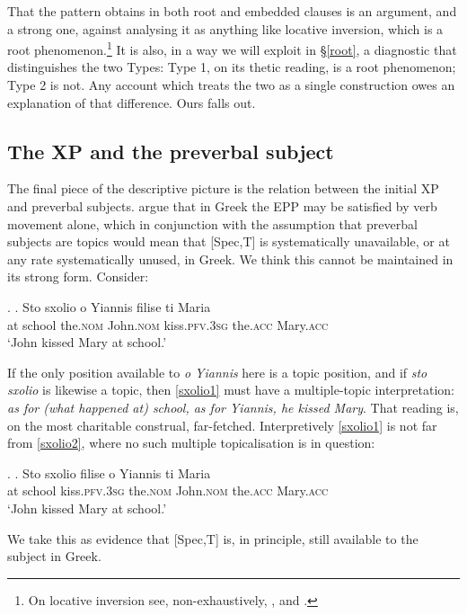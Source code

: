 \documentclass[11pt]{article}
\newcommand{\typa}{{Type 1}\xspace}
\newcommand{\typb}{{Type 2}\xspace}
\newcommand{\pfv}{\textsc{pfv}\xspace}
\begin{document}
That the pattern obtains in both root and embedded clauses is an argument, and a strong one, against analysing it as anything like locative inversion, which is a root phenomenon.\footnote{On locative inversion see, non-exhaustively, \citet{bresnan:94}, \citet{bresnan-kanerva:89} and \citet{levin-rappaport:95}.}  It is also, in a way we will exploit in \S\ref{root}, a diagnostic that distinguishes the two Types: \typa, on its thetic reading, is a root phenomenon; \typb is not.  Any account which treats the two as a single construction owes an explanation of that difference.  Ours falls out.

\subsection{The XP and the preverbal subject}\label{compdist}

The final piece of the descriptive picture is the relation between the initial XP and preverbal subjects.  \citet{alexiadou-anagnostopoulou:98} argue that in Greek the EPP may be satisfied by verb movement alone, which in conjunction with the assumption that preverbal subjects are topics \citep{philippaki:85, tsimpli:90} would mean that [Spec,T] is systematically unavailable, or at any rate systematically unused, in Greek.  We think this cannot be maintained in its strong form.  Consider:

\ex. \label{sxolio1}
\exg. Sto sxolio o Yiannis filise ti Maria\\
at school the.\textsc{nom} John.\textsc{nom} kiss.\pfv.3\textsc{sg} the.\textsc{acc} Mary.\textsc{acc}\\
`John kissed Mary at school.'

If the only position available to \emph{o Yiannis} here is a topic position, and if \emph{sto sxolio} is likewise a topic, then \ref{sxolio1} must have a multiple-topic interpretation: \emph{as for (what happened at) school, as for Yiannis, he kissed Mary}.  That reading is, on the most charitable construal, far-fetched.  Interpretively \ref{sxolio1} is not far from \ref{sxolio2}, where no such multiple topicalisation is in question:

\ex. \label{sxolio2}
\exg. Sto sxolio filise o Yiannis ti Maria\\
at school kiss.\pfv.3\textsc{sg} the.\textsc{nom} John.\textsc{nom} the.\textsc{acc} Mary.\textsc{acc}\\
`John kissed Mary at school.'

We take this as evidence that [Spec,T] is, in principle, still available to the subject in Greek.
\end{document}
